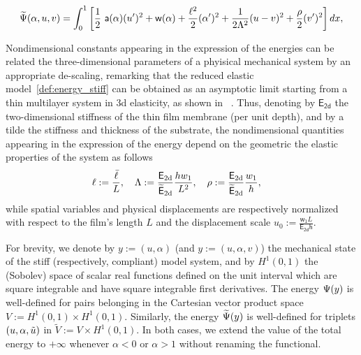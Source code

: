 \documentclass[10pt]{article}
\begin{document}
\begin{equation}
    \label{def:energy_compliant}
    \Ecompl(\alpha, u,  v) = \int_{0}^1 \left[ \frac{1}{2} \ \soften(\alpha)(u')^2 + \homogdiss(\alpha) + \frac{\damagell^2}{2}(\alpha')^2 
    + \frac{1}{2 \elastell^2} (u- v)^2 
    + \frac{\stiffratio}{2}  (v')^2 \right] dx,
\end{equation}


%

Nondimensional constants appearing in the expression of the energies can be related the three-dimensional parameters of a phyisical mechanical system by an appropriate de-scaling, remarking that the reduced elastic model~\eqref{def:energy_stiff} can be obtained as an asymptotic limit starting from a thin multilayer system in 3d elasticity, as shown in~\cite{Leon_Baldelli2015-rp} .
%
Thus, denoting by $\mathsf{E_\text{2d}}$ the two-dimensional stiffness of the thin film membrane (per unit depth), and by a tilde the stiffness and thickness of the substrate, the nondimensional quantities appearing in the expression of the energy depend on the geometric the elastic properties of the system as follows
\begin{equation}
    \label{def:dimensional_parameters}
    \ell := \frac{\bar{\ell}}{L}, \quad
    \Lambda := \frac{\mathsf{E_{\text{2d}}}}{{\mathsf{\widetilde E_{\text{2d}}}}}\frac{h w_1}{L^2}, \quad
    \rho := \frac{\mathsf{E_{\text{2d}}}}{{\mathsf{\widetilde E_{\text{2d}}}}}\frac{w_1}{h}, \quad
\end{equation}
while spatial variables and physical displacements are respectively normalized with respect to the film's length $L$ and the displacement scale $u_0 := \frac{\mathsf{w_1}L}{\mathsf{E_{\text{2d}} h}}$.




%

For brevity, we denote by $y:=(u, \alpha)$ (and $y:=(u, \alpha, v)$) the mechanical state of the stiff (respectively, compliant) model system, and by $H^1(0, 1)$ the (Sobolev) space of scalar real functions defined on the unit interval which are square integrable and have square integrable first derivatives. The energy $\Psi(y)$ is well-defined for pairs belonging in the Cartesian vector product space $V:=H^1(0,1)\times  H^1(0,1)$. Similarly, the energy $\widetilde\Psi(y)$ is well-defined for triplets $(u, \alpha, \tilde u)$ in $\widetilde V:=V\times  H^1(0,1)$. In both cases, we extend the value of the total energy to $+\infty$ whenever $\alpha < 0$ or $\alpha > 1$ without renaming the functional.
%

%
%
\end{document}
